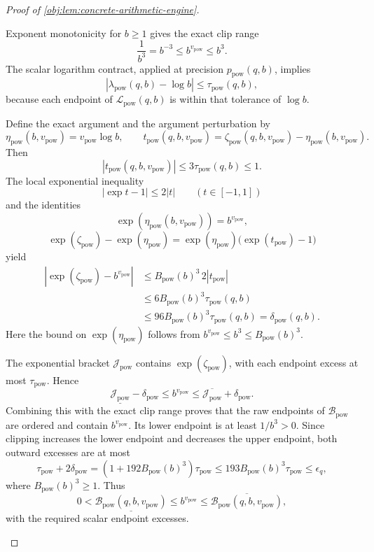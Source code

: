 \documentclass[11pt]{article}
\begin{document}
\begin{proof}[Proof of \cref{obj:lem:concrete-arithmetic-engine}]
\begin{enumerate}
Exponent monotonicity for \(b\ge1\) gives the exact clip range
\[
\frac1{b^3}=b^{-3}\le b^{v_{\mathrm{pow}}}\le b^3.
\]
The scalar logarithm contract, applied at precision \(p_{\mathrm{pow}}(q,b)\), implies
\[
|\lambda_{\mathrm{pow}}(q,b)-\log b|
 \le\tau_{\mathrm{pow}}(q,b),
\]
because each endpoint of \(\mathcal L_{\mathrm{pow}}(q,b)\) is within that tolerance of \(\log b\).

Define the exact argument and the argument perturbation by
\[
\eta_{\mathrm{pow}}(b,v_{\mathrm{pow}})
 =v_{\mathrm{pow}}\log b,
\qquad
t_{\mathrm{pow}}(q,b,v_{\mathrm{pow}})
 =\zeta_{\mathrm{pow}}(q,b,v_{\mathrm{pow}})
  -\eta_{\mathrm{pow}}(b,v_{\mathrm{pow}}).
\]
Then
\[
|t_{\mathrm{pow}}(q,b,v_{\mathrm{pow}})|
 \le3\tau_{\mathrm{pow}}(q,b)\le1.
\]
The local exponential inequality
\[
|\exp t-1|\le2|t|\qquad (t\in[-1,1])
\]
and the identities
\[
\exp(\eta_{\mathrm{pow}}(b,v_{\mathrm{pow}}))
 =b^{v_{\mathrm{pow}}},
\]
\[
\exp(\zeta_{\mathrm{pow}})
 -\exp(\eta_{\mathrm{pow}})
 =
\exp(\eta_{\mathrm{pow}})\bigl(\exp(t_{\mathrm{pow}})-1\bigr)
\]
yield
\[
\begin{split}
|\exp(\zeta_{\mathrm{pow}})-b^{v_{\mathrm{pow}}}|
&\le B_{\mathrm{pow}}(b)^3\,2|t_{\mathrm{pow}}|\\
&\le6B_{\mathrm{pow}}(b)^3\tau_{\mathrm{pow}}(q,b)\\
&\le96B_{\mathrm{pow}}(b)^3\tau_{\mathrm{pow}}(q,b)
 =\delta_{\mathrm{pow}}(q,b).
\end{split}
\]
Here the bound on \(\exp(\eta_{\mathrm{pow}})\) follows from
\(b^{v_{\mathrm{pow}}}\le b^3\le B_{\mathrm{pow}}(b)^3\).

The exponential bracket \(\mathcal J_{\mathrm{pow}}\) contains
\(\exp(\zeta_{\mathrm{pow}})\), with each endpoint excess at most
\(\tau_{\mathrm{pow}}\). Hence
\[
\underline{\mathcal J_{\mathrm{pow}}}-\delta_{\mathrm{pow}}
 \le b^{v_{\mathrm{pow}}}
 \le\overline{\mathcal J_{\mathrm{pow}}}+\delta_{\mathrm{pow}}.
\]
Combining this with the exact clip range proves that the raw endpoints of
\(\mathcal B_{\mathrm{pow}}\) are ordered and contain \(b^{v_{\mathrm{pow}}}\).
Its lower endpoint is at least \(1/b^3>0\). Since clipping increases the lower endpoint and decreases the upper endpoint, both outward excesses are at most
\[
\tau_{\mathrm{pow}}+2\delta_{\mathrm{pow}}
 =(1+192B_{\mathrm{pow}}(b)^3)\tau_{\mathrm{pow}}
 \le193B_{\mathrm{pow}}(b)^3\tau_{\mathrm{pow}}
 \le\epsilon_q,
\]
where \(B_{\mathrm{pow}}(b)^3\ge1\). Thus
\[
0<\underline{\mathcal B_{\mathrm{pow}}(q,b,v_{\mathrm{pow}})}
 \le b^{v_{\mathrm{pow}}}
 \le\overline{\mathcal B_{\mathrm{pow}}(q,b,v_{\mathrm{pow}})},
\]
with the required scalar endpoint excesses.


\end{enumerate}
\end{proof}
\end{document}
